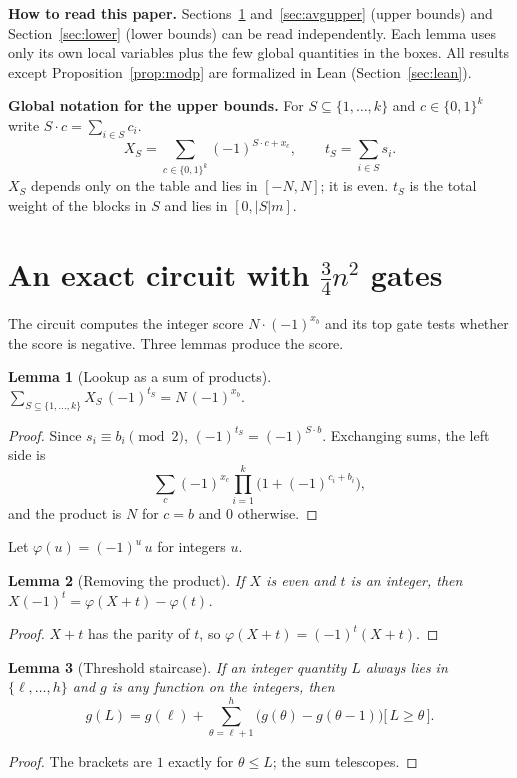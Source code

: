\documentclass[11pt,letterpaper]{article}
\newtheorem{lemma}{Lemma}
\newcommand{\bits}{\{0,1\}}
\newcommand{\ind}[1]{\bigl[\,#1\,\bigr]}
\newcommand{\sect}[1]{\section{\color{ink}#1}}
\newcommand{\smalltitle}[1]{\textbf{\color{ink}#1}\quad}
\begin{document}
\smalltitle{How to read this paper.}
Sections~\ref{sec:upper} and~\ref{sec:avgupper} (upper bounds) and
Section~\ref{sec:lower} (lower bounds) can be read independently.
Each lemma uses only its own local variables plus the few global quantities
in the boxes. All results except Proposition~\ref{prop:modp} are
formalized in Lean (Section~\ref{sec:lean}).

\begin{keybox}
\textbf{Global notation for the upper bounds.}
For $S\subseteq\{1,\dots,k\}$ and $c\in\bits^k$ write $S\cdot c=\sum_{i\in S}c_i$.
\[
X_S=\sum_{c\in\bits^k}(-1)^{S\cdot c+x_c},\qquad
t_S=\sum_{i\in S}s_i .
\]
$X_S$ depends only on the table and lies in $[-N,N]$; it is even.
$t_S$ is the total weight of the blocks in $S$ and lies in $[0,|S|m]$.
\end{keybox}

\sect{An exact circuit with \texorpdfstring{$\tfrac34 n^2$}{3/4 n\^{}2} gates}\label{sec:upper}

The circuit computes the integer score $N\cdot(-1)^{x_b}$ and its top gate
tests whether the score is negative. Three lemmas produce the score.

\begin{lemma}[Lookup as a sum of products]\label{lem:lookup}
$\displaystyle\sum_{S\subseteq\{1,\dots,k\}}X_S\,(-1)^{t_S}=N\,(-1)^{x_b}.$
\end{lemma}
\begin{proof}
Since $s_i\equiv b_i\pmod2$, $(-1)^{t_S}=(-1)^{S\cdot b}$. Exchanging sums,
the left side is
\[
\sum_c(-1)^{x_c}\prod_{i=1}^k\bigl(1+(-1)^{c_i+b_i}\bigr),
\]
and the product is $N$ for $c=b$ and $0$ otherwise.
\end{proof}

Let $\varphi(u)=(-1)^u\,u$ for integers $u$.

\begin{lemma}[Removing the product]\label{lem:parity}
If $X$ is even and $t$ is an integer, then $X(-1)^t=\varphi(X+t)-\varphi(t)$.
\end{lemma}
\begin{proof}
$X+t$ has the parity of $t$, so $\varphi(X+t)=(-1)^t(X+t)$.
\end{proof}

\begin{lemma}[Threshold staircase]\label{lem:ladder}
If an integer quantity $L$ always lies in $\{\ell,\dots,h\}$ and $g$ is any
function on the integers, then
\[
g(L)=g(\ell)+\sum_{\theta=\ell+1}^{h}\bigl(g(\theta)-g(\theta-1)\bigr)\ind{L\ge\theta}.
\]
\end{lemma}
\begin{proof}
The brackets are $1$ exactly for $\theta\le L$; the sum telescopes.
\end{proof}
\end{document}
